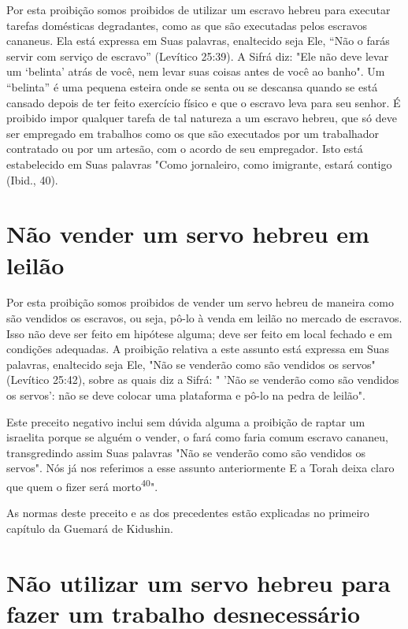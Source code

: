 Por esta proibição somos proibidos de utilizar um escravo hebreu para
executar tarefas domésticas degradantes, como as que são executadas
pe­los escravos cananeus. Ela está expressa em Suas palavras, enaltecido
seja Ele, ``Não o farás servir com serviço de escravo'' (Levítico 25:39).
A Sifrá diz: "Ele não deve levar um `belinta' atrás de você, nem levar
suas coisas antes de você ao banho". Um ``belinta'' é uma pequena esteira
onde se senta ou se descansa quando se está cansado depois de ter feito
exercício físico e que o escravo leva para seu senhor. É proibido impor
qualquer tarefa de tal natureza a um escravo hebreu, que só deve ser
empregado em trabalhos como os que são executados por um trabalhador
contratado ou por um artesão, com o acordo de seu em­pregador. Isto está
estabelecido em Suas palavras "Como jornaleiro, como imi­grante, estará
contigo (Ibid., 40).

\section{Não vender um servo hebreu em leilão}

Por esta proibição somos proibidos de vender um servo hebreu de maneira
como são vendidos os escravos, ou seja, pô-lo à venda em leilão no
mercado de escravos. Isso não deve ser feito em hipótese alguma; deve
ser fei­to em local fechado e em condições adequadas. A proibição
relativa a este as­sunto está expressa em Suas palavras, enaltecido seja
Ele, "Não se venderão co­mo são vendidos os servos" (Levítico 25:42),
sobre as quais diz a Sifrá: " 'Não se venderão como são vendidos os
servos': não se deve colocar uma platafor­ma e pô-lo na pedra de
leilão".

Este preceito negativo inclui sem dúvida alguma a proibição de rap­tar
um israelita porque se alguém o vender, o fará como faria comum escravo
cananeu, transgredindo assim Suas palavras "Não se venderão como são
vendi­dos os servos". Nós já nos referimos a esse assunto anteriormente
E a Torah deixa claro que quem o fizer será morto\textsuperscript{40}".

As normas deste preceito e as dos precedentes estão explicadas no
primeiro capítulo da Guemará de Kidushin.

\section{Não utilizar um servo hebreu para fazer um trabalho desnecessário}

